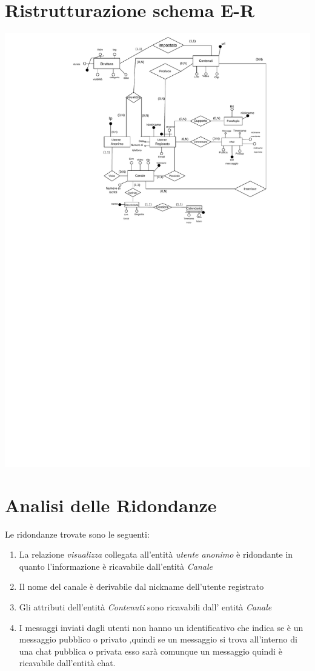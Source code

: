\section{Ristrutturazione schema E-R}
\includegraphics[width=\textwidth]{resources/e_r-ridotto.pdf}

\section{Analisi delle Ridondanze}
Le ridondanze trovate sono le seguenti:
\begin{enumerate}
    \item La relazione \textit{visualizza} collegata all'entità \textit{utente anonimo} è ridondante in quanto l'informazione è ricavabile dall'entità \textit{Canale}
    \item Il nome del canale è derivabile dal nickname dell'utente registrato
    \item Gli attributi dell'entità \textit{Contenuti} sono ricavabili dall' entità \textit{Canale}
    \item I messaggi inviati dagli utenti non hanno un identificativo che indica se è un messaggio pubblico o privato ,quindi se un messaggio si trova all'interno di una
          chat pubblica o privata esso sarà comunque un messaggio quindi è ricavabile dall'entità chat. 
\end{enumerate}

